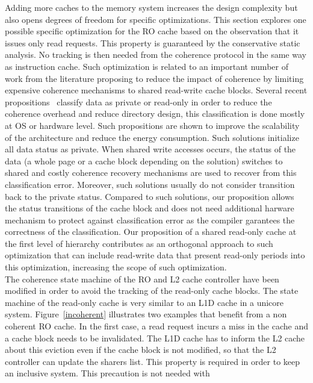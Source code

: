 \documentclass[sigconf]{acmart}
\begin{document}
Adding more caches to the memory system increases the design complexity but also opens degrees of freedom for specific optimizations. This section explores one possible specific optimization for the RO cache based on the observation that it issues only read requests. This property is guaranteed by the conservative static analysis. No tracking is then needed from the coherence protocol in the same way as instruction cache. Such optimization is related to an important number of work from the literature proposing to reduce the impact of coherence by limiting expensive coherence mechanisms to shared read-write cache blocks. Several recent propositions~\cite{Cuesta:2013}\cite{Ros:2012}\cite{Davari:2015} classify data as private or read-only in order to reduce the coherence overhead and reduce directory design, this classification is done mostly at OS or hardware level. Such propositions are shown to improve the scalability of the architecture and reduce the energy consumption. Such solutions initialize all data status as private. When shared write accesses occurs, the status of the data (a whole page or a cache block depending on the solution) switches to shared and costly coherence recovery mechanisms are used to recover from this classification error. Moreover, such solutions usually do not consider transition back to the private status. Compared to such solutions, our proposition allows the status transitions of the cache block and does not need additional harware mechanism to protect against classification error as the compiler garantees the correctness of the classification. Our proposition of a shared read-only cache at the first level of hierarchy contributes as an orthogonal approach to such optimization that can include read-write data that present read-only periods into this optimization, increasing the scope of such optimization.\\
\indent The coherence state machine of the RO and L2 cache controller have
been modified in order to avoid the tracking of the read-only cache
blocks. The state machine of the read-only cache is very similar to an
L1D cache in a unicore system. Figure~\ref{incoherent} illustrates two
examples that benefit from a non coherent RO cache. In the first case,
a read request incurs a miss in the cache and a cache block needs to
be invalidated. The L1D cache has to inform the L2 cache about this
eviction even if the cache block is not modified, so that the L2
controller can update the sharers list. This property is required in
order to keep an inclusive system. This precaution is not needed with
\end{document}
